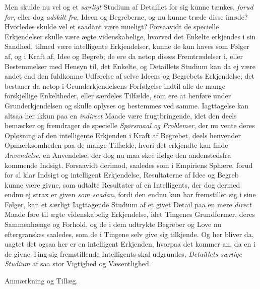 \documentclass[12pt,a4paper]{book}
\newcommand{\apage}[1]{\marginnote{\footnotesize\textit{[#1]}}}
\begin{document}
Men skulde nu vel og et \emph{særligt} Studium af Detaillet for sig kunne tænkes,
\emph{forud for}, eller dog \emph{adskilt fra}, Ideen og Begreberne, og nu kunne
træde disse imøde? Hvorledes skulde vel et saadant være mueligt? Forsaavidt de
specielle \apage{147}  Erkjendelser skulle være ægte videnskabelige, hvorved det Enkelte
erkjendes i sin Sandhed, tilmed være intelligente Erkjendelser, kunne de kun haves
som Følger af, og i Kraft af, Idee og Begreb; de ere da netop disses
Fremtrædelser i, eller Bestemmelser med Hensyn til, det Enkelte, og Detaillets
Studium kan da ej være andet end den fuldkomne Udførelse af selve Ideens og
Begrebets Erkjendelse; det bestaaer da netop i Grunderkjendelsens Forfølgelse
indtil alle de mange forskjellige Enkeltheder, eller særdeles Tilfælde, som ere at
henføre under Grunderkjendelsen og skulle oplyses og bestemmes ved samme.
Iagttagelse kan altsaa her ikkun paa en \emph{indirect} Maade være frugtbringende,
idet den deels bemærker og fremdrager de specielle \emph{Spørsmaal og Problemer},
der nu vente deres Opløsning af den intelligente Erkjenden i Kraft af Begrebet,
deels henvender Opmærksomheden paa de mange Tilfælde, hvori det erkjendte kan
finde \emph{Anvendelse}, en Anvendelse, der dog nu maa skee ifølge den
andenstedsfra kommende Indsigt. Forsaavidt derimod, saaledes som i Empiriens
Sphære, forud for al klar Indsigt og intelligent Erkjendelse, Resultaterne af Idee
og Begreb kunne være givne, som udtalte Resultater af en Intelligents, der dog
dermed endnu ej strax er given \emph{som saadan}, fordi den endnu kun har fremstillet sig
i sine \apage{148} Følger, kan et særligt Iagttagende Studium af et givet Detail paa en mere
\emph{direct} Maade føre til ægte videnskabelig Erkjendelse, idet Tingenes
Grundformer, deres Sammenhænge og Forhold, og de i dem udtrykte Begreber og Love
nu eftergranskes saaledes, som de i Tingene selv give sig tilkjende. Og her bliver
da, uagtet det ogsaa her er en intelligent Erkjenden, hvorpaa det kommer an, da en
i de givne Ting sig fremstillende Intelligents skal udgrundes, \emph{Detaillets
særlige Studium} af saa stor Vigtighed og Væsentlighed.

\begin{center}Anmærkning og Tillæg.\end{center}
\end{document}
